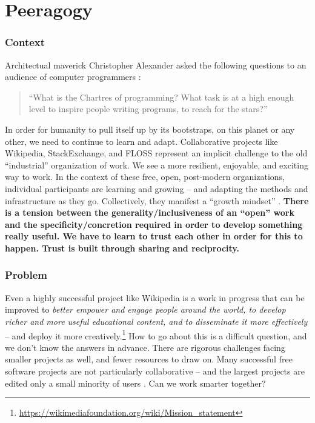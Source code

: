 \section{Peeragogy}\label{sec:Peeragogy}

\subsubsection*{Context}  Architectual maverick Christopher Alexander asked the following questions to an audience of computer programmers \cite{alexander1999origins}: 
\begin{quote}
``What is the Chartres of programming? What task is at a high enough level to inspire people writing programs, to reach for the stars?''
\end{quote}
In order for humanity to pull itself up by its bootstraps, on this planet or any other, we need to continue to learn and adapt.  Collaborative projects like Wikipedia, StackExchange, and FLOSS represent an implicit challenge to the old ``industrial'' organization of work.  We see a more resilient, enjoyable, and exciting way to work.  In the context of these free, open, post-modern organizations, individual participants are learning and growing -- and adapting the methods and infrastructure as they go.  Collectively, they manifest a ``growth mindset'' \cite{dweck,ranciere}.
\textbf{There is a tension between the generality/inclusiveness of an ``open'' work and the specificity/concretion required in order to develop something really useful.  We have to learn to trust each other in order for this to happen.  Trust is built through sharing and reciprocity.}

\subsubsection*{Problem} Even a highly successful project like Wikipedia is a work in progress that can be improved to \emph{\emph{better} empower and engage people around the world, to develop \emph{richer and more useful} educational content, and to disseminate it \emph{more} effectively} -- and deploy it more creatively.\footnote{\url{https://wikimediafoundation.org/wiki/Mission_statement}}  How to go about this is a difficult question, and we don't know the answers in advance.  There are rigorous challenges facing smaller projects as well, and fewer resources to draw on.  Many successful free software projects are not particularly collaborative -- and the largest projects are edited only a small minority of users \cite{free-software-better,who-writes-wikipedia}.  Can we work smarter together?

